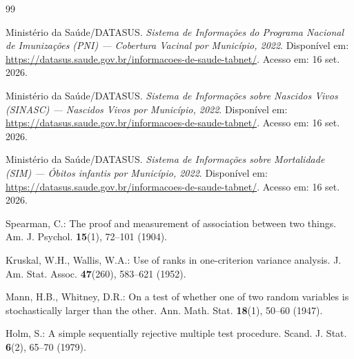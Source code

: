 \documentclass[pdflatex,sn-mathphys-num]{sn-jnl}
\begin{document}
\begin{thebibliography}{99}

 Ministério da Saúde/DATASUS. \emph{Sistema de Informações do Programa Nacional de Imunizações (PNI) — Cobertura Vacinal por Município, 2022}. Disponível em: \url{https://datasus.saude.gov.br/informacoes-de-saude-tabnet/}. Acesso em: 16 set. 2026.

 Ministério da Saúde/DATASUS. \emph{Sistema de Informações sobre Nascidos Vivos (SINASC) — Nascidos Vivos por Município, 2022}. Disponível em: \url{https://datasus.saude.gov.br/informacoes-de-saude-tabnet/}. Acesso em: 16 set. 2026.

 Ministério da Saúde/DATASUS. \emph{Sistema de Informações sobre Mortalidade (SIM) — Óbitos infantis por Município, 2022}. Disponível em: \url{https://datasus.saude.gov.br/informacoes-de-saude-tabnet/}. Acesso em: 16 set. 2026.

 Spearman, C.: The proof and measurement of association between two things. Am. J. Psychol. \textbf{15}(1), 72--101 (1904).

 Kruskal, W.H., Wallis, W.A.: Use of ranks in one-criterion variance analysis. J. Am. Stat. Assoc. \textbf{47}(260), 583--621 (1952).

 Mann, H.B., Whitney, D.R.: On a test of whether one of two random variables is stochastically larger than the other. Ann. Math. Stat. \textbf{18}(1), 50--60 (1947).

 Holm, S.: A simple sequentially rejective multiple test procedure. Scand. J. Stat. \textbf{6}(2), 65--70 (1979).

\end{thebibliography}
\end{document}
